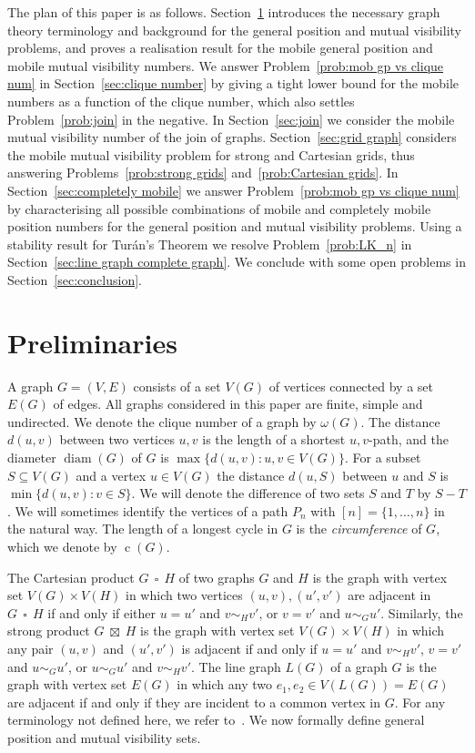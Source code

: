 \documentclass[a4paper,12pt]{article}
\DeclareMathOperator{\strongprod}{\,\boxtimes\,}
\DeclareMathOperator{\diam}{diam}
\DeclareMathOperator{\cir}{c}
\DeclareMathOperator{\cp}{\,\square\,}
\theoremstyle{definition}
\begin{document}
	The plan of this paper is as follows. Section~\ref{sec:preliminaries} introduces the necessary graph theory terminology and background for the general position and mutual visibility problems, and proves a realisation result for the mobile general position and mobile mutual visibility numbers. We answer Problem~\ref{prob:mob gp vs clique num} in Section~\ref{sec:clique number} by giving a tight lower bound for the mobile numbers as a function of the clique number, which also settles Problem~\ref{prob:join} in the negative. In Section~\ref{sec:join} we consider the mobile mutual visibility number of the join of graphs. Section~\ref{sec:grid graph} considers the mobile mutual visibility problem for strong and Cartesian grids, thus answering Problems~\ref{prob:strong grids} and~\ref{prob:Cartesian grids}. In Section~\ref{sec:completely mobile} we answer Problem~\ref{prob:mob gp vs clique num} by characterising all possible combinations of mobile and completely mobile position numbers for the general position and mutual visibility problems. Using a stability result for Tur\'{a}n's Theorem we resolve Problem~\ref{prob:LK_n} in Section~\ref{sec:line graph complete graph}. We conclude with some open problems in Section~\ref{sec:conclusion}.
	
	\section{Preliminaries}\label{sec:preliminaries}
	
	A graph $G = (V,E)$ consists of a set $V(G)$ of vertices connected by a set $E(G)$ of edges. All graphs considered in this paper are finite, simple and undirected. We denote the clique number of a graph by $\omega (G)$. The distance $d(u,v)$ between two vertices $u,v$ is the length of a shortest $u,v$-path, and the diameter $\diam (G)$ of $G$ is $\max \{ d(u,v):u,v \in V(G)\} $. For a subset $S \subseteq V(G)$ and a vertex $u \in V(G)$ the distance $d(u,S)$ between $u$ and $S$ is $\min \{ d(u,v):v \in S\} $. We will denote the difference of two sets $S$ and $T$ by $S-T$. We will sometimes identify the vertices of a path $P_n$ with $[n] = \{ 1,\dots ,n\} $ in the natural way. The length of a longest cycle in $G$ is the \emph{circumference} of $G$, which we denote by $\cir (G)$.
	
	The Cartesian product $G \cp H$ of two graphs $G$ and $H$ is the graph with vertex set $V(G) \times V(H)$ in which two vertices $(u,v),(u',v')$ are adjacent in $G \cp H$ if and only if either $u = u'$ and $v \sim_H v'$, or $v = v'$ and $u \sim_G u'$. Similarly, the strong product $G \strongprod H$ is the graph with vertex set $V(G) \times V(H)$ in which any pair $(u,v)$ and $(u',v')$ is adjacent if and only if $u = u'$ and $ v \sim _H v'$, $v = v'$ and $u \sim _G u'$, or $u \sim _G u'$ and $v \sim _H v'$. The line graph $L(G)$ of a graph $G$ is the graph with vertex set $E(G)$ in which any two $e_1,e_2 \in V(L(G)) = E(G)$ are adjacent if and only if they are incident to a common vertex in $G$. For any terminology not defined here, we refer to~\cite{Graphsdigraphs}. We now formally define general position and mutual visibility sets.
	
\end{document}
